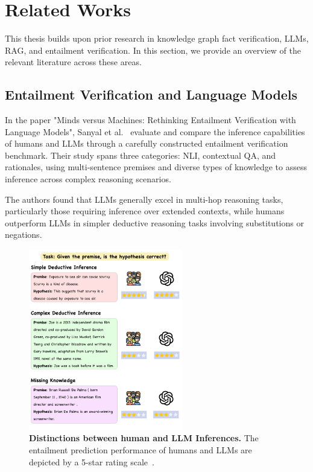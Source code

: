 \chapter{Related Works}\label{ch:related_works}
This thesis builds upon prior research in knowledge graph fact verification, \ac{LLMs}, \ac{RAG}, and entailment verification.
In this section, we provide an overview of the relevant literature across these areas.

\section{Entailment Verification and Language Models}\label{sec:entailment-verification}
In the paper "Minds versus Machines: Rethinking Entailment Verification with Language Models", Sanyal et al.~\cite{sanyal2024machinesbettercomplexreasoning} evaluate and compare the inference capabilities of humans and \ac{LLMs} through a carefully constructed entailment verification benchmark.
Their study spans three categories: \ac{NLI}, contextual \ac{QA}, and rationales, using multi-sentence premises and diverse types of knowledge to assess inference across complex reasoning scenarios.

The authors found that LLMs generally excel in multi-hop reasoning tasks, particularly those requiring inference over extended contexts, while humans outperform \ac{LLMs} in simpler deductive reasoning tasks involving substitutions or negations.

\begin{figure}[ht!]
    \centering
    \begin{minipage}[b]{\textwidth}
        \centering
        \includegraphics[width=0.6\textwidth]{res/rel-human-llm-inference}
        \caption{\textbf{Distinctions between human and LLM Inferences.} The entailment prediction performance of humans and LLMs are depicted by a 5-star rating scale~\cite{sanyal2024machinesbettercomplexreasoning}.}
        \label{fig:distinguishing-human-llm-inferences}
    \end{minipage}
\end{figure}

